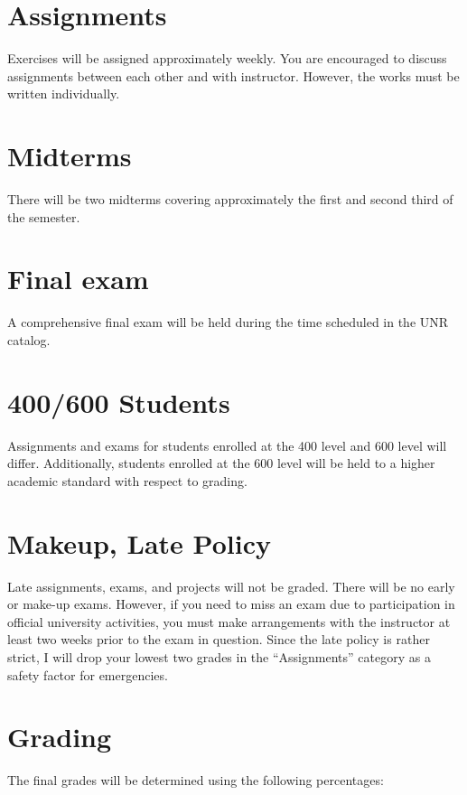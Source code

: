 \documentclass[11pt,onecolumn]{article}
\begin{document}
\section*{Assignments}
Exercises will be assigned approximately weekly. You are encouraged to discuss  assignments between each other and with instructor. However, the works must be written individually.

\section*{Midterms}
There will be two midterms covering approximately the first and second third of the semester.

\section*{Final exam}
A comprehensive final exam will be held during the time scheduled in the UNR catalog.

\section*{400/600 Students}
Assignments and exams for students enrolled at the 400 level and 600 level will differ. Additionally, students enrolled at the 600 level will be held to a higher academic standard with respect to grading.

\section*{Makeup, Late Policy}
Late assignments, exams, and projects will not be graded. There will be no early or make-up exams. However, if you need to miss an exam due to participation in official university activities, you must make arrangements with the instructor at least two weeks prior to the exam in question. Since the late policy is rather strict, I will drop your lowest two grades in the ``Assignments'' category as a safety factor for emergencies.

\section*{Grading}
The final grades will be determined using the following percentages:
\end{document}
